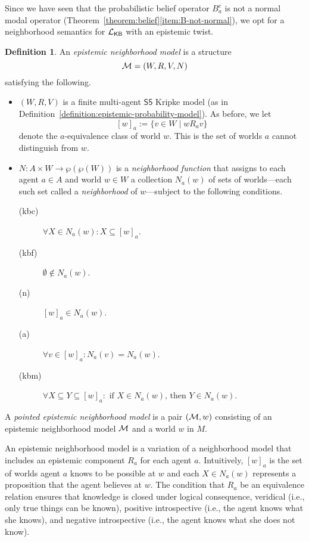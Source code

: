 \documentclass[12pt]{article}
\theoremstyle{definition}
\newtheorem{definition}[theorem]{Definition}
\newcommand{\M}{{\cal M}}      %
\newcommand{\Lang}{{\cal L}}   %
\newcommand{\KB}{{\mathsf{KB}}}                        %
\begin{document}
Since we have seen that the probabilistic belief operator $B_a^c$ is
not a normal modal operator
(Theorem~\ref{theorem:belief}\eqref{item:B-not-normal}), we opt for a
neighborhood semantics for $\Lang_\KB$ \cite[Ch.~7]{Chellas:ml} with
an epistemic twist.

\begin{definition} 
  An \emph{epistemic neighborhood model} is a structure
  \[
  \M=(W,R,V,N)
  \]
  satisfying the following.
  \begin{itemize}
  \item $(W,R,V)$ is a finite multi-agent $\mathsf{S5}$ Kripke model
    (as in Definition~\ref{definition:epistemic-probability-model}).
    As before, we let 
    \[
    [w]_a:=\{v\in W\mid wR_av\}
    \]
    denote the $a$-equivalence class of world $w$.  This is the
    set of worlds $a$ cannot distinguish from $w$.

  \item $N : A\times W \to \wp(\wp(W))$ is a \emph{neighborhood
      function} that assigns to each agent $a\in A$ and world $w\in W$
    a collection $N_a(w)$ of sets of worlds---each such set called a
    \emph{neighborhood} of $w$---subject to the following conditions.
    \begin{description}
    \item[(kbc)] $\forall X \in N_a(w) : X \subseteq [w]_a$.

    \item[(kbf)] $\emptyset\notin N_a(w)$.
      
    \item[(n)] $[w]_a\in N_a(w)$.
      
    \item[(a)] $\forall v \in [w]_a : N_a(v) = N_a(w)$.

    \item[(kbm)] $\forall X \subseteq Y \subseteq [w]_a : 
      \text{ if } X \in N_a(w) \text{, then } Y \in N_a(w)$.
   \end{description}
  \end{itemize}
  A \emph{pointed epistemic neighborhood model} is a pair $(\M,w)$
  consisting of an epistemic neighborhood model $\M$ and a world $w$
  in $M$. 
\end{definition}

An epistemic neighborhood model is a variation of a neighborhood model that
includes an epistemic component $R_a$ for each agent $a$.
Intuitively, $[w]_a$ is the set of worlds agent $a$ knows to be
possible at $w$ and each $X\in N_a(w)$ represents a proposition that
the agent believes at $w$.  The condition that $R_a$ be an equivalence
relation ensures that knowledge is closed under logical consequence,
veridical (i.e., only true things can be known), positive
introspective (i.e., the agent knows what she knows), and negative
introspective (i.e., the agent knows what she does not know).
\end{document}
